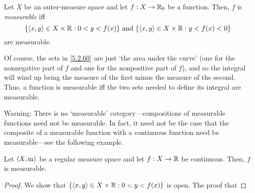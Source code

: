 \begin{dfn}\label{MeasurableFunction}
Let $X$ be an outer-measure space and let $f:X\rightarrow \mathbb{R} _0$ be a function.  Then, $f$ is \emph{measurable} iff
\begin{equation}\label{5.2.60}
\{ \langle x,y\rangle\in X\times \mathbb{R} :0<y<f(x)\} \text{ and }\{ \langle x,y\rangle\in X\times \mathbb{R} :y<f(x)<0\}
\end{equation}
are measurable.
\begin{rmk}
Of course, the sets in \eqref{5.2.60} are just `the area under the curve' (one for the nonnegative part of $f$ and one for the nonpositive part of $f$), and so the integral will wind up being the measure of the first minus the measure of the second.  Thus, a function is measurable iff the two sets needed to define its integral are measurable.
\end{rmk}
\begin{rmk}
Warning:  There is no `measurable' category---compositions of measurable functions need not be measurable.  In fact, it need not be the case that the composite of a measurable function with a continuous function need be measurable---see the following example.
\end{rmk}
\end{dfn}
\begin{prp}
Let $\langle X,\mathrm{m}\rangle$ be a regular measure space and let $f:X\rightarrow \mathbb{R}$ be continuous.  Then, $f$ is measurable.
\begin{proof}
We show that $\{ \langle x,y\rangle\in X\times \mathbb{R} :0<y<f(x)\}$ is open.  The proof that
\end{proof}
\end{prp}
